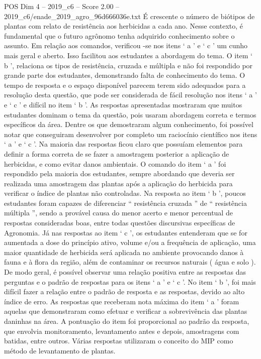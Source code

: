\begin{textsample}{POS Dim 4 – 2019\_c6 – Score 2.00 – 2019\_c6/enade\_2019\_agro\_96d666036e.txt}
É crescente o número de biótipos de plantas com relato de resistência aos herbicidas a cada ano.
Nesse contexto, é fundamental que o futuro agrônomo tenha adquirido conhecimento sobre o assunto.
Em relação aos comandos, verificou -se nos itens ‘ a ’ e ‘ c ’ um cunho mais geral e aberto.
Isso facilitou aos estudantes a abordagem do tema.
O item ‘ b ’, relaciona os tipos de resistência, cruzada e múltipla e não foi respondido por grande parte dos estudantes, demonstrando falta de conhecimento do tema.
O tempo de resposta e o espaço disponível parecem terem sido adequados para a resolução desta questão, que pode ser considerada de fácil resolução nos itens ‘ a ’ e ‘ c ’ e difícil no item ‘ b ’.
As respostas apresentadas mostraram que muitos estudantes dominam o tema da questão, pois usaram abordagem correta e termos específicos da área.
Dentre os que demostraram algum conhecimento, foi possível notar que conseguiram desenvolver por completo um raciocínio científico nos itens ‘ a ’ e ‘ c ’.
Na maioria das respostas ficou claro que possuíam elementos para definir a forma correta de se fazer a amostragem posterior a aplicação de herbicidas, e como evitar danos ambientais.
O comando do item ‘ a ’ foi respondido pela maioria dos estudantes, sempre abordando que deveria ser realizada uma amostragem das plantas após a aplicação do herbicida para verificar o índice de plantas não controladas.
Na resposta ao item ‘ b ’, poucos estudantes foram capazes de diferenciar “ resistência cruzada ” de “ resistência múltipla ”, sendo a provável causa do menor acerto e menor percentual de respostas consideradas boas, entre todas questões discursivas específicas de Agronomia.
Já nas respostas ao item ‘ c ’, os estudantes entenderam que se for aumentada a dose do princípio ativo, volume e/ou a frequência de aplicação, uma maior quantidade de herbicida será aplicada no ambiente provocando danos à fauna e à flora da região, além de contaminar os recursos naturais ( água e solo ).
De modo geral, é possível observar uma relação positiva entre as respostas das perguntas e o padrão de respostas para os itens ‘ a ’ e ‘ c ’.
No item ‘ b ’, foi mais difícil fazer a relação entre o padrão de resposta e as respostas, devido ao alto índice de erro.
As respostas que receberam nota máxima do item ‘ a ’ foram aquelas que demonstraram como efetuar e verificar a sobrevivência das plantas daninhas na área.
A pontuação do item foi proporcional ao padrão da resposta, que envolvia monitoramento, levantamento antes e depois, amostragens com batidas, entre outros.
Várias respostas utilizaram o conceito do MIP como método de levantamento de plantas.

\end{textsample}
